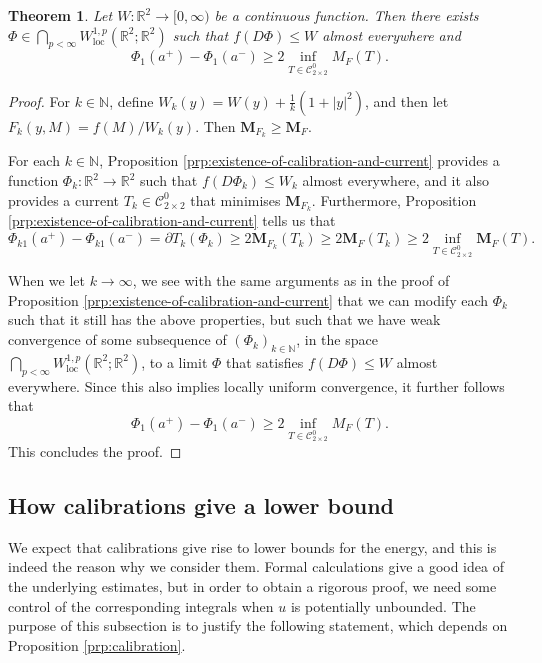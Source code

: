 \documentclass[a4paper]{article}
\newcommand{\R}{\mathbb{R}}
\newcommand{\N}{\mathbb{N}}
\newcommand{\M}{\mathbf{M}}
\newcommand{\loc}{\mathrm{loc}}
\newcommand{\ncrt}{\mathcal{C}}
\newtheorem{theorem}{Theorem}
\theoremstyle{definition}
\theoremstyle{remark}
\begin{document}
\begin{theorem} \label{thm:existence-of-calibration}
Let $W \colon \R^2 \to [0, \infty)$ be a continuous function. Then there exists
$\Phi \in \bigcap_{p < \infty} W_\loc^{1, p}(\R^2; \R^2)$ such that $f(D\Phi) \le W$ almost everywhere
and
\[
\Phi_1(a^+) - \Phi_1(a^-) \ge 2 \inf_{T \in \ncrt_{2 \times 2}^0} M_F(T).
\]
\end{theorem}

\begin{proof}
For $k \in \N$, define $W_k(y) = W(y) + \frac{1}{k}(1 + |y|^2)$, and then let
$F_k(y, M) = f(M)/W_k(y)$. Then $\M_{F_k} \ge  \M_F$.

For each $k \in \N$, Proposition \ref{prp:existence-of-calibration-and-current}
provides a function $\Phi_k \colon \R^2 \to \R^2$ such that $f(D\Phi_k) \le W_k$ almost everywhere,
and it also provides a current $T_k \in \ncrt_{2 \times 2}^0$
that minimises $\M_{F_k}$.
Furthermore, Proposition \ref{prp:existence-of-calibration-and-current} tells us that
\[
\Phi_{k1}(a^+) - \Phi_{k1}(a^-) = \partial T_k(\Phi_k) \ge 2 \M_{F_k}(T_k) \ge 2\M_F(T_k) \ge 2 \inf_{T \in \ncrt_{2 \times 2}^0} \M_F(T).
\]

When we let $k \to \infty$, we see with the same arguments as in the proof of
Proposition \ref{prp:existence-of-calibration-and-current} that we can modify each $\Phi_k$
such that it still has the above properties, but such that we have
weak convergence of some subsequence of $(\Phi_k)_{k \in \N}$,
in the space $\bigcap_{p < \infty} W_\loc^{1, p}(\R^2; \R^2)$,
to a limit $\Phi$ that satisfies $f(D\Phi) \le W$ almost everywhere.
Since this also implies locally uniform convergence, it further follows that
\[
\Phi_1(a^+) - \Phi_1(a^-) \ge 2 \inf_{T \in \ncrt_{2 \times 2}^0} M_F(T).
\]
This concludes the proof.
\end{proof}





\subsection{How calibrations give a lower bound}

We expect that calibrations give rise to lower bounds for the energy, and this is indeed the reason why
we consider them. Formal calculations give a good idea of the underlying estimates, but in order to
obtain a rigorous proof, we need some control of the corresponding integrals when $u$ is potentially unbounded.
The purpose of this subsection is to justify the following statement, which
depends on Proposition \ref{prp:calibration}.
\end{document}
